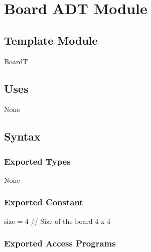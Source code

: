 \documentclass[12pt]{article}
\begin{document}
\newpage

\section* {Board ADT Module}

\subsection*{Template Module}

BoardT

\subsection* {Uses}

None

\subsection* {Syntax}

\subsubsection* {Exported Types}

None

\subsubsection* {Exported Constant}

size = 4 \quad // Size of the board 4 x 4

\subsubsection* {Exported Access Programs}
\end{document}
